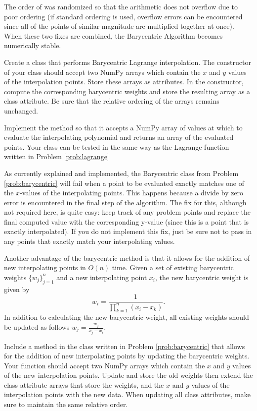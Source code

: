 The order of  was randomized so that the arithmetic does not overflow due to poor ordering (if standard ordering is used, overflow errors can be encountered since all
of the points of similar magnitude are multiplied together at once).
When these two fixes are combined, the Barycentric Algorithm becomes numerically stable.

\begin{problem}
\label{prob:barycentric}
Create a class that performs Barycentric Lagrange interpolation.
The constructor of your class should accept two NumPy arrays which contain the $x$ and $y$ values of the interpolation points.
Store these arrays as attributes.
In the constructor, compute the corresponding barycentric weights and store the resulting array as a class attribute.
Be sure that the relative ordering of the arrays remains unchanged.

Implement the  method so that it accepts a NumPy array of values at which to evaluate the interpolating polynomial and returns an array of the evaluated points.
Your class can be tested in the same way as the Lagrange function written in Problem \ref{prob:lagrange}
\end{problem}

\begin{warn}
As currently explained and implemented, the Barycentric class from Problem \ref{prob:barycentric} will fail when a point to be evaluated exactly matches one of the $x$-values of the interpolating points.
This happens because a divide by zero error is encountered in the final step of the algorithm.
The fix for this, although not required here, is quite easy: keep track of any problem points and replace the final computed value with the corresponding y-value (since this is a point that is exactly interpolated).
If you do not implement this fix, just be sure not to pass in any points that exactly match your interpolating values.
\end{warn}

Another advantage of the barycentric method is that it allows for the addition of new interpolating points in $O(n)$ time.
Given a set of existing barycentric weights $\{ w_j\}_{j=1}^n$ and a new interpolating point $x_i$, the new barycentric weight is given by
\[
w_i = \frac{1}{\prod_{k=1}^n (x_i-x_k)}.
\]
In addition to calculating the new barycentric weight, all existing weights should be updated as follows $w_j=\frac{w_j}{x_j-x_i}$.

\begin{problem}
\label{prob:add weights}
Include a method in the class written in Problem \ref{prob:barycentric} that allows for the addition of new interpolating points by updating the barycentric weights.
Your function should accept two NumPy arrays which contain the $x$ and $y$ values of the new interpolation points.
Update and store the old weights then extend the class attribute arrays that store the weights, and the $x$ and $y$ values of the interpolation points with the new data.
When updating all class attributes, make sure to maintain the same relative order.
\end{problem}

